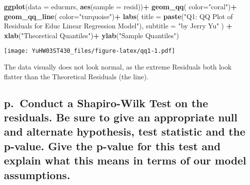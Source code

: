 \documentclass[
]{article}
\newenvironment{Shaded}{\begin{snugshade}}{\end{snugshade}}
\newcommand{\AttributeTok}[1]{\textcolor[rgb]{0.13,0.29,0.53}{#1}}
\newcommand{\FunctionTok}[1]{\textcolor[rgb]{0.13,0.29,0.53}{\textbf{#1}}}
\newcommand{\NormalTok}[1]{#1}
\newcommand{\OtherTok}[1]{\textcolor[rgb]{0.56,0.35,0.01}{#1}}
\newcommand{\SpecialCharTok}[1]{\textcolor[rgb]{0.81,0.36,0.00}{\textbf{#1}}}
\newcommand{\StringTok}[1]{\textcolor[rgb]{0.31,0.60,0.02}{#1}}
\begin{document}
\begin{Shaded}
\begin{Highlighting}[]
\FunctionTok{ggplot}\NormalTok{(}\AttributeTok{data =}\NormalTok{ educmrs, }\FunctionTok{aes}\NormalTok{(}\AttributeTok{sample =}\NormalTok{ resid))}\SpecialCharTok{+}
  \FunctionTok{geom\_qq}\NormalTok{( }\AttributeTok{color=}\StringTok{"coral"}\NormalTok{)}\SpecialCharTok{+}
  \FunctionTok{geom\_qq\_line}\NormalTok{( }\AttributeTok{color=}\StringTok{"turquoise"}\NormalTok{)}\SpecialCharTok{+}
  \FunctionTok{labs}\NormalTok{(}
    \AttributeTok{title =} \FunctionTok{paste}\NormalTok{(}\StringTok{"Q1: QQ Plot of Residuals for Educ Linear Regression Model"}\NormalTok{),}
    \AttributeTok{subtitle =} \StringTok{"by Jerry Yu"}
\NormalTok{  ) }\SpecialCharTok{+}
  \FunctionTok{xlab}\NormalTok{(}\StringTok{"Theoretical Quantiles"}\NormalTok{)}\SpecialCharTok{+}
  \FunctionTok{ylab}\NormalTok{(}\StringTok{"Sample Quantiles"}\NormalTok{)}
\end{Highlighting}
\end{Shaded}

\texttt{[image: YuHW03ST430\_files/figure-latex/qq1-1.pdf]}

The data visually does not look normal, as the extreme Residuals both
look flatter than the Theoretical Residuals (the line).

\hypertarget{p.-conduct-a-shapiro-wilk-test-on-the-residuals.-be-sure-to-give-an-appropriate-null-and-alternate-hypothesis-test-statistic-and-the-p-value.-give-the-p-value-for-this-test-and-explain-what-this-means-in-terms-of-our-model-assumptions.}{%
\subsection{p.~Conduct a Shapiro-Wilk Test on the residuals. Be sure to
give an appropriate null and alternate hypothesis, test statistic and
the p-value. Give the p-value for this test and explain what this means
in terms of our model
assumptions.}\label{p.-conduct-a-shapiro-wilk-test-on-the-residuals.-be-sure-to-give-an-appropriate-null-and-alternate-hypothesis-test-statistic-and-the-p-value.-give-the-p-value-for-this-test-and-explain-what-this-means-in-terms-of-our-model-assumptions.}}

\begin{Shaded}
\end{Shaded}
\end{document}
